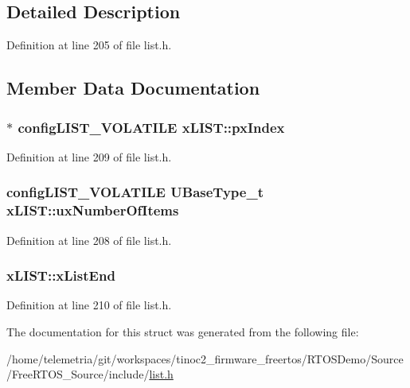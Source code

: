 \subsection{Detailed Description}


Definition at line 205 of file list.\+h.



\subsection{Member Data Documentation}
\subsubsection[{\texorpdfstring{px\+Index}{pxIndex}}]{$\ast$ {\bf config\+L\+I\+S\+T\+\_\+\+V\+O\+L\+A\+T\+I\+LE} x\+L\+I\+S\+T\+::px\+Index}\hypertarget{structx_l_i_s_t_a7bf64d87701493b4c8c5c977682500d7}{}\label{structx_l_i_s_t_a7bf64d87701493b4c8c5c977682500d7}


Definition at line 209 of file list.\+h.

\subsubsection[{\texorpdfstring{ux\+Number\+Of\+Items}{uxNumberOfItems}}]{ {\bf config\+L\+I\+S\+T\+\_\+\+V\+O\+L\+A\+T\+I\+LE} {\bf U\+Base\+Type\+\_\+t} x\+L\+I\+S\+T\+::ux\+Number\+Of\+Items}\hypertarget{structx_l_i_s_t_aa5cb7cdc699e1252af0441e46e427a03}{}\label{structx_l_i_s_t_aa5cb7cdc699e1252af0441e46e427a03}


Definition at line 208 of file list.\+h.

\subsubsection[{\texorpdfstring{x\+List\+End}{xListEnd}}]{ x\+L\+I\+S\+T\+::x\+List\+End}\hypertarget{structx_l_i_s_t_a49ad62fa153126e27e273811167b336a}{}\label{structx_l_i_s_t_a49ad62fa153126e27e273811167b336a}


Definition at line 210 of file list.\+h.



The documentation for this struct was generated from the following file\+:\begin{DoxyCompactItemize}
\item 
/home/telemetria/git/workspaces/tinoc2\+\_\+firmware\+\_\+freertos/\+R\+T\+O\+S\+Demo/\+Source/\+Free\+R\+T\+O\+S\+\_\+\+Source/include/\hyperlink{list_8h}{list.\+h}\end{DoxyCompactItemize}
